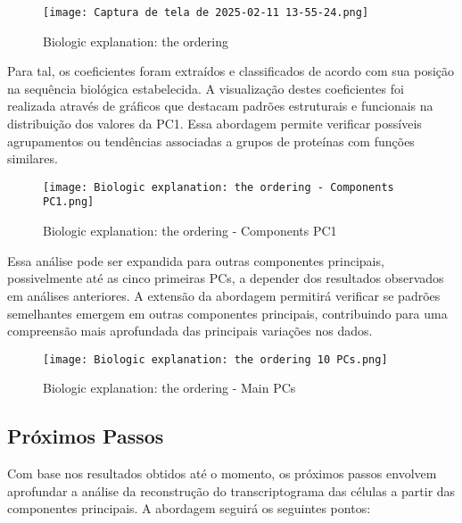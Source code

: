 \documentclass[12pt]{article}
\begin{document}
\begin{figure}
    \centering
    \texttt{[image: Captura de tela de 2025-02-11 13-55-24.png]}
    \caption{Biologic explanation: the ordering}
    \label{fig:enter-label}
\end{figure}

Para tal, os coeficientes foram extraídos e classificados de acordo com sua posição na sequência biológica estabelecida. A visualização destes coeficientes foi realizada através de gráficos que destacam padrões estruturais e funcionais na distribuição dos valores da PC1. Essa abordagem permite verificar possíveis agrupamentos ou tendências associadas a grupos de proteínas com funções similares.

\begin{figure}
    \centering
    \texttt{[image: Biologic explanation: the ordering - Components PC1.png]}
    \caption{Biologic explanation: the ordering - Components PC1}
    \label{fig:enter-label}
\end{figure}

Essa análise pode ser expandida para outras componentes principais, possivelmente até as cinco primeiras PCs, a depender dos resultados observados em análises anteriores. A extensão da abordagem permitirá verificar se padrões semelhantes emergem em outras componentes principais, contribuindo para uma compreensão mais aprofundada das principais variações nos dados.

\begin{figure}
    \centering
    \texttt{[image: Biologic explanation: the ordering 10 PCs.png]}
    \caption{Biologic explanation: the ordering - Main PCs}
    \label{fig:enter-label}
\end{figure}

\newpage

\subsection{Próximos Passos}
Com base nos resultados obtidos até o momento, os próximos passos envolvem aprofundar a análise da reconstrução do transcriptograma das células a partir das componentes principais. A abordagem seguirá os seguintes pontos:
\end{document}
